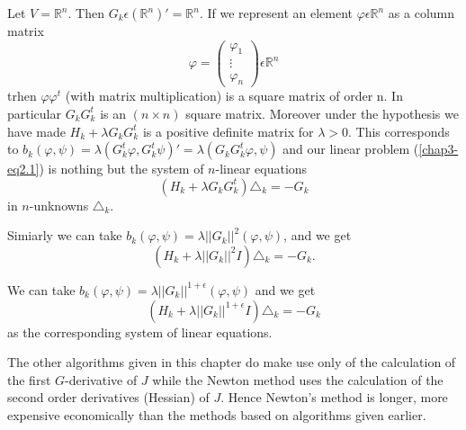 \begin{remark}\label{chap3-rem2.3}
\begin{example}\label{chap3-exam2.4}
Let $V = \mathbb{R}^{n}$. Then $G_{k} \epsilon (\mathbb{R}^{n})' = \mathbb{R}^{n}$. If we represent an element $\varphi \epsilon \mathbb{R}^{n}$ as a column matrix
\begin{equation*}
\varphi = 
\begin{pmatrix}
\varphi_{1}\\
\vdots\\
\varphi_{n}
\end{pmatrix}
\epsilon \mathbb{R}^{n}
\end{equation*}
trhen $\varphi \varphi^{t}$ (with matrix multiplication) is a square matrix of order n. In particular $G_{k} G_{k}^{t}$ is an $(n \times n)$ square matrix. Moreover under the hypothesis we have made $H_{k} + \lambda G_{k} G_{k}^{t}$ is a positive definite matrix for $\lambda > 0$. This corresponds to $b_{k}(\varphi, \psi) = \lambda(G_{k}^{t} \varphi, G_{k}^{t} \psi)' = \lambda(G_{k} G_{k}^{t} \varphi,\psi)$ and our linear problem (\ref{chap3-eq2.1}) is nothing but the system of $n$-linear equations 
$$
(H_{k} + \lambda G_{k} G_{k}^{t}) \triangle_{k} = -G_{k}
$$
in $n$-unknowns $\triangle_{k}$.
\end{example}
\end{remark}

\begin{example}\label{chap3-exam2.5}
Simiarly we can take $b_{k} (\varphi, \psi) = \lambda ||G_{k}||^{2} (\varphi, \psi)$, and we get
$$
(H_{k} + \lambda ||G_{k}||^{2} I) \triangle_{k} = -G_{k}.
$$
\end{example}

\begin{example}\label{chap3-exam2.6}
We can take $b_{k} (\varphi, \psi) = \lambda ||G_{k}||^{1+\epsilon} (\varphi, \psi)$ and we get
$$
(H_{k} + \lambda ||G_{k}||^{1+\epsilon} I) \triangle_{k} = -G_{k}
$$
as the corresponding system of linear equations.
\end{example}\pageoriginale

\begin{remark}\label{chap3-rem2.4}
The other algorithms given in this chapter do make use only of the calculation of the first $G$-derivative of $J$ while the Newton method uses the calculation of the second order derivatives (Hessian) of $J$. Hence Newton's method is longer, more expensive economically than the methods based on algorithms given earlier.
\end{remark}

